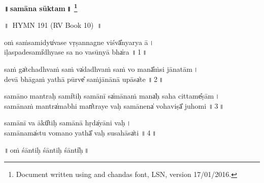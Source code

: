 \documentclass[parskip, DIV=18]{scrartcl}
\renewcommand{\thefootnote}{\fnsymbol{footnote}} %
\begin{document}

\vspace{-1.5cm}

\begin{center}
\textbf{{\Huge ॥\,samāna sūktam\,॥} \LARGE\let\thefootnote\relax\footnote{ \color{lightgray} Document written using \XeLaTeX{} and chandas font, LSN, version 17/01/2016.}}
\end{center}
\Large

\centering

\vspace{0.5cm}


॥\, HYMN 191 (RV Book 10) \,॥


oṁ saṁsa॒midyu̍vase vṛṣa॒nnagne॒ viśvā̎nya॒rya ā\,। \\
i॒ḷaspa॒desami̍dhyase॒ sa no॒ vasū॒nyā bha̍ra  ॥\,1\,॥ \par

saṁ ga̍tchadhva॒ṁ saṁ va̍dadhva॒ṁ saṁ vo॒ manā̎ṁsi jānatām\,। \\
de॒vā bhā॒gaṁ yathā॒ pūrve̎ saṁjānā॒nā u॒pāsa̍te  ॥\,2\,॥ \par

sa॒mā॒no mantra॒ḥ sami̍tiḥ samā॒nī sa̍mā॒naṁ mana̍ḥ sa॒ha ci॒ttame̎ṣām\,। \\
sa॒mā॒naṁ mantra̍ma॒bhi man̎traye vaḥ samā॒nena̍ voha॒viṣā̎ juhomi  ॥\,3\,॥ \par

sa॒mā॒nī va॒ ākū̎tiḥ samā॒nā hṛda̍yāni vaḥ\,। \\
sa॒mā॒nama̍stu vo॒mano॒ yathā̎ va॒ḥ susa॒hāsa̍ti  ॥\,4\,॥ \par


 
\vspace{0.5cm}
 
\begin{center}
 ॥\,oṁ śānti॒ḥ śānti॒ḥ śānti̍ḥ\,॥
\end{center}

\vspace{1.5cm}
\end{document}
